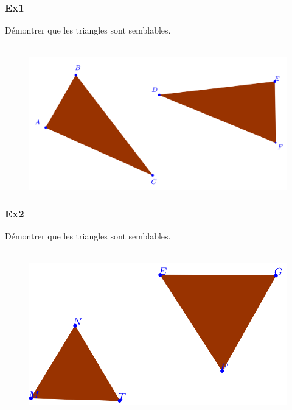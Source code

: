 \documentclass[11pt]{article}
\begin{document}
\begin{multicols}{2}

\subsubsection*{Ex1}

Démontrer que les triangles sont semblables.

\begin{figure}[H]
      \centering
      \includegraphics[width=0.9\linewidth]{3x2-triangles-semblables/ex1.png}
\end{figure}

\subsubsection*{Ex2}

Démontrer que les triangles sont semblables.

\begin{figure}[H]
      \centering
      \includegraphics[width=\linewidth]{3x2-triangles-semblables/ex2.png}
\end{figure}

\end{multicols}
\end{document}
